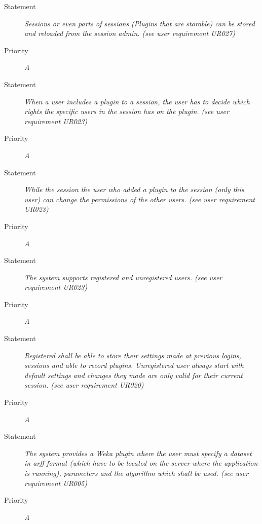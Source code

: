 \FR
\begin{description}
	\item[Statement]
		\textit{Sessions or even parts of sessions (Plugins that are storable) can be stored and reloaded from the session admin.
		(see user requirement UR027)}
	\item[Priority] \textit{A}
\end{description}

\FR
\begin{description}
	\item[Statement]
		\textit{When a user includes a plugin to a session, the user has to decide which rights the specific users in the session has on the plugin.
		(see user requirement UR023)}
	\item[Priority] \textit{A}
\end{description}

\FR
\begin{description}
	\item[Statement]
		\textit{While the session the user who added a plugin to the session (only this user) can change the permissions of the other users.
		(see user requirement UR023)}
	\item[Priority] \textit{A}
\end{description}

\FR
\begin{description}
	\item[Statement]
		\textit{The system supports registered and unregistered users. 
		(see user requirement UR023)}
	\item[Priority] \textit{A}
\end{description}

\FR
\begin{description}
	\item[Statement]
		\textit{Registered shall be able to store their settings made at previous logins, sessions and able to record plugins. Unregistered user always start with default settings and changes they made
are only valid for their current session. 
		(see user requirement UR020)}
	\item[Priority] \textit{A}
\end{description}

\FR
\begin{description}
  \item[Statement]
    \textit{The system provides a Weka plugin where the user must
      specify a dataset in arff format (which have to be located on
      the server where the application is running), parameters and the
      algorithm which shall be used. (see user requirement UR005)}
  \item[Priority]
    \textit{A}
\end{description}


